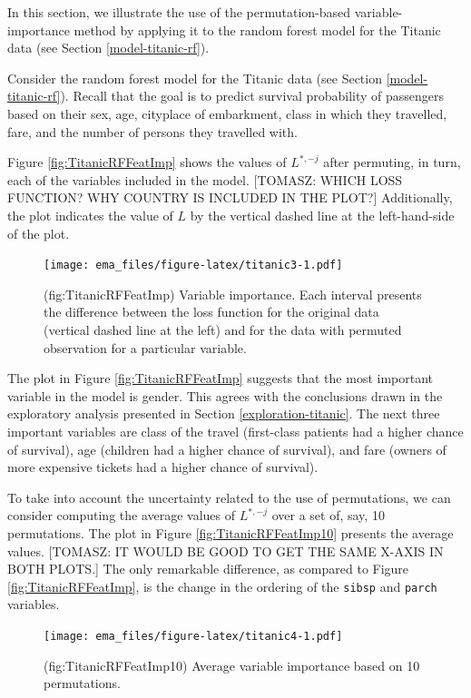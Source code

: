 \documentclass[12pt,]{krantz}
\begin{document}
In this section, we illustrate the use of the permutation-based variable-importance method by applying it to the random forest model for the Titanic data (see Section \ref{model-titanic-rf}).

Consider the random forest model for the Titanic data (see Section \ref{model-titanic-rf}). Recall that the goal is to predict survival probability of passengers based on their sex, age, cityplace of embarkment, class in which they travelled, fare, and the number of persons they travelled with.

Figure \ref{fig:TitanicRFFeatImp} shows the values of \(L^{*,-j}\) after permuting, in turn, each of the variables included in the model. {[}TOMASZ: WHICH LOSS FUNCTION? WHY COUNTRY IS INCLUDED IN THE PLOT?{]} Additionally, the plot indicates the value of \(L\) by the vertical dashed line at the left-hand-side of the plot.

\begin{figure}
\centering
\texttt{[image: ema\_files/figure-latex/titanic3-1.pdf]}
\caption{\label{fig:titanic3}(fig:TitanicRFFeatImp) Variable importance. Each interval presents the difference between the loss function for the original data (vertical dashed line at the left) and for the data with permuted observation for a particular variable.}
\end{figure}

The plot in Figure \ref{fig:TitanicRFFeatImp} suggests that the most important variable in the model is gender. This agrees with the conclusions drawn in the exploratory analysis presented in Section \ref{exploration-titanic}. The next three important variables are class of the travel (first-class patients had a higher chance of survival), age (children had a higher chance of survival), and fare (owners of more expensive tickets had a higher chance of survival).

To take into account the uncertainty related to the use of permutations, we can consider computing the average values of \(L^{*,-j}\) over a set of, say, 10 permutations. The plot in Figure \ref{fig:TitanicRFFeatImp10} presents the average values. {[}TOMASZ: IT WOULD BE GOOD TO GET THE SAME X-AXIS IN BOTH PLOTS.{]} The only remarkable difference, as compared to Figure \ref{fig:TitanicRFFeatImp}, is the change in the ordering of the \texttt{sibsp} and \texttt{parch} variables.

\begin{figure}
\centering
\texttt{[image: ema\_files/figure-latex/titanic4-1.pdf]}
\caption{\label{fig:titanic4}(fig:TitanicRFFeatImp10) Average variable importance based on 10 permutations.}
\end{figure}
\end{document}
